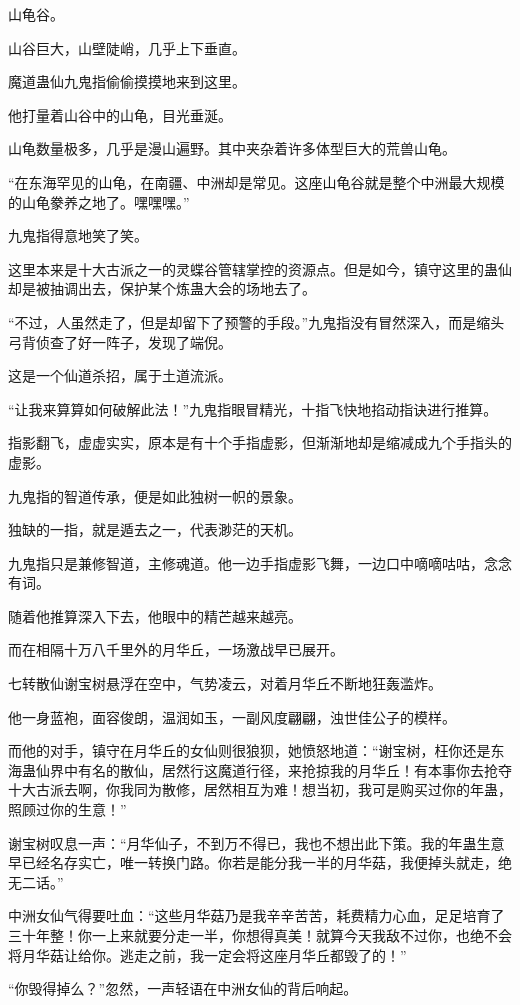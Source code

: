 \begin{this_body}
山龟谷。

山谷巨大，山壁陡峭，几乎上下垂直。

魔道蛊仙九鬼指偷偷摸摸地来到这里。

他打量着山谷中的山龟，目光垂涎。

山龟数量极多，几乎是漫山遍野。其中夹杂着许多体型巨大的荒兽山龟。

“在东海罕见的山龟，在南疆、中洲却是常见。这座山龟谷就是整个中洲最大规模的山龟豢养之地了。嘿嘿嘿。”

九鬼指得意地笑了笑。

这里本来是十大古派之一的灵蝶谷管辖掌控的资源点。但是如今，镇守这里的蛊仙却是被抽调出去，保护某个炼蛊大会的场地去了。

“不过，人虽然走了，但是却留下了预警的手段。”九鬼指没有冒然深入，而是缩头弓背侦查了好一阵子，发现了端倪。

这是一个仙道杀招，属于土道流派。

“让我来算算如何破解此法！”九鬼指眼冒精光，十指飞快地掐动指诀进行推算。

指影翻飞，虚虚实实，原本是有十个手指虚影，但渐渐地却是缩减成九个手指头的虚影。

九鬼指的智道传承，便是如此独树一帜的景象。

独缺的一指，就是遁去之一，代表渺茫的天机。

九鬼指只是兼修智道，主修魂道。他一边手指虚影飞舞，一边口中嘀嘀咕咕，念念有词。

随着他推算深入下去，他眼中的精芒越来越亮。

而在相隔十万八千里外的月华丘，一场激战早已展开。

七转散仙谢宝树悬浮在空中，气势凌云，对着月华丘不断地狂轰滥炸。

他一身蓝袍，面容俊朗，温润如玉，一副风度翩翩，浊世佳公子的模样。

而他的对手，镇守在月华丘的女仙则很狼狈，她愤怒地道：“谢宝树，枉你还是东海蛊仙界中有名的散仙，居然行这魔道行径，来抢掠我的月华丘！有本事你去抢夺十大古派去啊，你我同为散修，居然相互为难！想当初，我可是购买过你的年蛊，照顾过你的生意！”

谢宝树叹息一声：“月华仙子，不到万不得已，我也不想出此下策。我的年蛊生意早已经名存实亡，唯一转换门路。你若是能分我一半的月华菇，我便掉头就走，绝无二话。”

中洲女仙气得要吐血：“这些月华菇乃是我辛辛苦苦，耗费精力心血，足足培育了三十年整！你一上来就要分走一半，你想得真美！就算今天我敌不过你，也绝不会将月华菇让给你。逃走之前，我一定会将这座月华丘都毁了的！”

“你毁得掉么？”忽然，一声轻语在中洲女仙的背后响起。


\end{this_body}
